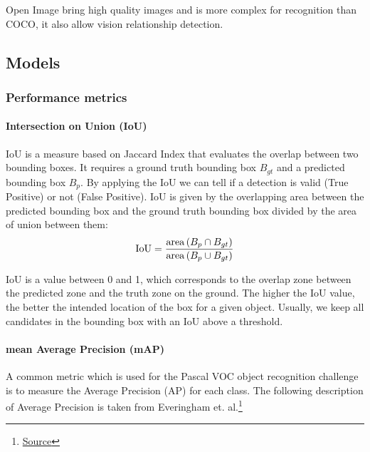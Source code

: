 Open Image bring high quality images and is more complex for recognition than COCO, it also allow vision relationship detection.


\pagebreak\subsection{Models}
\subsubsection{Performance metrics}
\paragraph{Intersection on Union (IoU)}
IoU is a measure based on Jaccard Index that evaluates the overlap between two bounding boxes. It requires a ground truth bounding box \begin{math}B_{gt}\end{math} and a predicted bounding box \begin{math}B_{p}\end{math}. 
By applying the IoU we can tell if a detection is valid (True Positive) or not (False Positive).
IoU is given by the overlapping area between the predicted bounding box and the ground truth bounding box divided by the area of union between them: 
\begin{gather*}
\centering
\mathrm{IoU}=\frac{\operatorname{area}\left(B_{p} \cap B_{g t}\right)}{\operatorname{area}\left(B_{p} \cup B_{g t}\right)}
\end{gather*}

IoU is a value between 0 and 1, which corresponds to the overlap zone between the predicted zone and the truth zone on the ground. The higher the IoU value, the better the intended location of the box for a given object. Usually, we keep all candidates in the bounding box with an IoU above a threshold.


\pagebreak\paragraph{mean Average Precision (mAP)}

A common metric which is used for the Pascal VOC object recognition challenge is to measure the Average Precision (AP) for each class. The following description of Average Precision is taken from Everingham et. al.\footnote{\href{http://homepages.inf.ed.ac.uk/ckiw/postscript/ijcv_voc09.pdf}{Source}}

